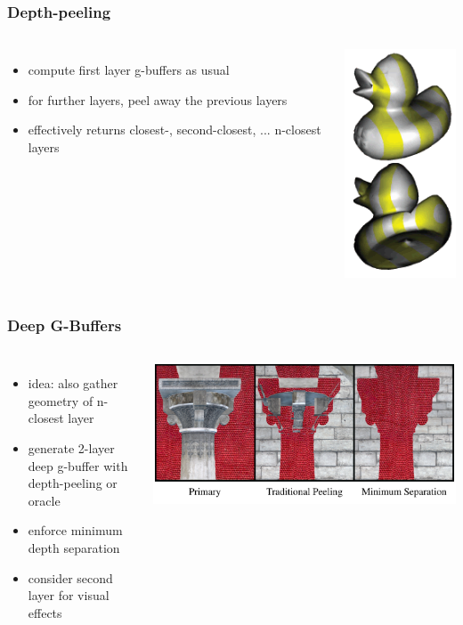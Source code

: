 \documentclass[aspectratio=169]{beamer}
\begin{document}
	\begin{frame}
		\frametitle{Depth-peeling}
		\begin{columns}
				\begin{itemize}
					\item compute first layer g-buffers as usual
					\item for further layers, peel away the previous layers
					\item effectively returns closest-, second-closest, ... n-closest layers
				\end{itemize}
				\includegraphics[height=.8\textheight]{img/depth_peeling_duck.png}
		\end{columns}
	\end{frame}	

	\begin{frame}
		\frametitle{Deep G-Buffers}
		\begin{columns}
			\column{.5\textwidth}
				\begin{itemize}
					\item idea: also gather geometry of n-closest layer
					\item generate 2-layer deep g-buffer with depth-peeling or oracle
					\item enforce minimum depth separation
					\item consider second layer for visual effects
				\end{itemize}
			\column{.5\textwidth}
				\includegraphics[height=.49\textwidth]{img/minimum_depth_separation.png}
		\end{columns}
	\end{frame}	
\end{document}
